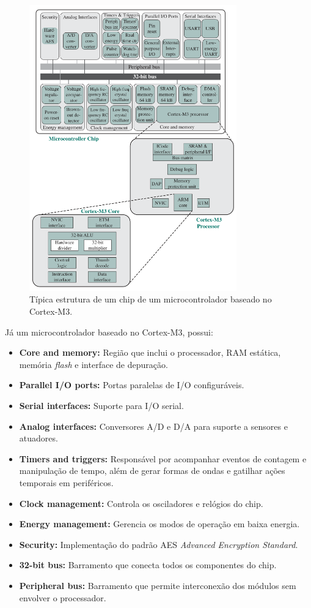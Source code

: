 \documentclass{article}
\begin{document}
\begin{figure}[h]
    \centering
    \includegraphics[width=0.8\textwidth]{cortex.png}
    \caption{Típica estrutura de um chip de um microcontrolador baseado no
    Cortex-M3.}
\end{figure}

Já um microcontrolador baseado no Cortex-M3, possui:

\begin{itemize}
    \item \textbf{Core and memory:} Região que inclui o processador, RAM
        estática, memória \textit{flash} e interface de depuração.
    \item \textbf{Parallel I/O ports:} Portas paralelas de I/O configuráveis.
    \item \textbf{Serial interfaces:} Suporte para I/O serial.
    \item \textbf{Analog interfaces:} Conversores A/D e D/A para suporte a
        sensores e atuadores.
    \item \textbf{Timers and triggers:} Responsável por acompanhar eventos de
        contagem e manipulação de tempo, além de gerar formas de ondas e
        gatilhar ações temporais em periféricos.
    \item \textbf{Clock management:} Controla os osciladores e relógios do chip.
    \item \textbf{Energy management:} Gerencia os modos de operação em baixa
        energia.
    \item \textbf{Security:} Implementação do padrão AES \textit{Advanced
        Encryption Standard}.
    \item \textbf{32-bit bus:} Barramento que conecta todos os componentes do
        chip.
    \item \textbf{Peripheral bus:} Barramento que permite interconexão dos
        módulos sem envolver o processador.
\end{itemize}
\end{document}
